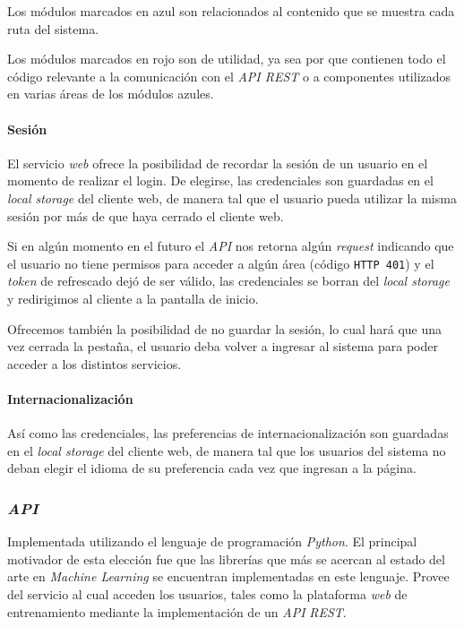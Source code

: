 \documentclass[12pt,a4paper,]{scrartcl}
\let\oldparagraph\paragraph
\renewcommand{\paragraph}[1]{\oldparagraph{#1}\mbox{}}
\begin{document}
Los módulos marcados en azul son relacionados al contenido que se muestra cada ruta del sistema.

Los módulos marcados en rojo son de utilidad, ya sea por que contienen todo el código relevante a la comunicación con el \emph{API REST} o a componentes utilizados en varias áreas de los módulos azules.

\hypertarget{sesiuxf3n}{%
\paragraph{Sesión}\label{sesiuxf3n}}

El servicio \emph{web} ofrece la posibilidad de recordar la sesión de un usuario en el momento de realizar el login. De elegirse, las credenciales son guardadas en el \emph{local storage} del cliente web, de manera tal que el usuario pueda utilizar la misma sesión por más de que haya cerrado el cliente web.

Si en algún momento en el futuro el \emph{API} nos retorna algún \emph{request} indicando que el usuario no tiene permisos para acceder a algún área (código \texttt{HTTP\ 401}) y el \emph{token} de refrescado dejó de ser válido, las credenciales se borran del \emph{local storage} y redirigimos al cliente a la pantalla de inicio.

Ofrecemos también la posibilidad de no guardar la sesión, lo cual hará que una vez cerrada la pestaña, el usuario deba volver a ingresar al sistema para poder acceder a los distintos servicios.

\hypertarget{internacionalizaciuxf3n}{%
\paragraph{Internacionalización}\label{internacionalizaciuxf3n}}

Así como las credenciales, las preferencias de internacionalización son guardadas en el \emph{local storage} del cliente web, de manera tal que los usuarios del sistema no deban elegir el idioma de su preferencia cada vez que ingresan a la página.

\hypertarget{api-2}{%
\subsubsection{\texorpdfstring{\emph{API}}{API}}\label{api-2}}

Implementada utilizando el lenguaje de programación \emph{Python}. El principal motivador de esta elección fue que las librerías que más se acercan al estado del arte en \emph{Machine Learning} se encuentran implementadas en este lenguaje. Provee del servicio al cual acceden los usuarios, tales como la plataforma \emph{web} de entrenamiento mediante la implementación de un \emph{API} \emph{REST}.
\end{document}
